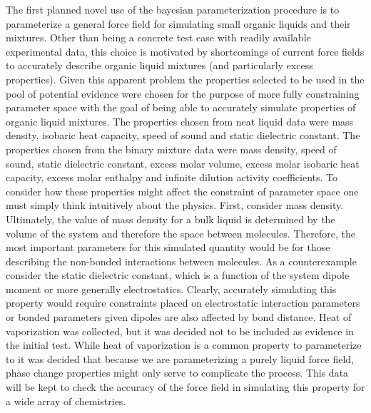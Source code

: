 \documentclass[rmp,nofootinbib,superscriptaddress,12pt,tightenlines,notitlepage]{revtex4-1}
\begin{document}
The first planned novel use of the bayesian parameterization procedure is to parameterize a general force field for simulating small organic liquids
and their mixtures. Other than being a concrete test case with readily available experimental data, this choice is motivated by shortcomings of current
force fields to accurately describe organic liquid mixtures (and particularly excess properties).\cite{mix} Given this apparent problem the properties
selected to be used in the pool of potential evidence were chosen for the purpose of more fully constraining parameter space with the goal of being 
able to accurately simulate properties of organic liquid mixtures. The properties chosen from neat liquid data were mass density, isobaric heat capacity, 
speed of sound and static dielectric constant. The properties chosen from the binary mixture data were mass density, speed of sound, static dielectric constant, excess molar volume, excess molar isobaric heat capacity, excess molar enthalpy and infinite dilution activity coefficients. To consider how these properties
might affect the constraint of parameter space one must simply think intuitively about the physics. First, consider mass density. Ultimately, the value of mass 
density for a bulk liquid is determined by the volume of the system and therefore the space between molecules. Therefore, the most important parameters for 
this simulated quantity would be for those describing the non-bonded interactions between molecules. As a counterexample consider the static dielectric constant, 
which is a function of the system dipole moment or more generally electrostatics. Clearly, accurately simulating this property would require constraints placed 
on electrostatic interaction parameters or bonded parameters given dipoles are also affected by bond distance. Heat of vaporization was 
collected, but it was decided not to be included as evidence in the initial test. While heat of vaporization is a common property to parameterize to it was 
decided that because we are parameterizing a purely liquid force field, phase change properties might only serve to complicate the process. This data will 
be kept to check the accuracy of the force field in simulating this property for a wide array of chemistries. 
\end{document}
